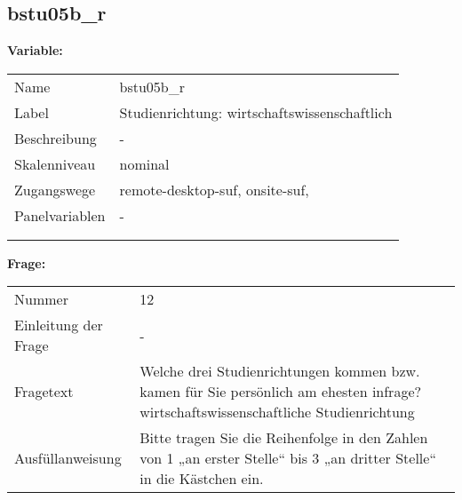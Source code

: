 	
	
	\subsection{bstu05b\_r}
	\label{subSection:bstu05b_r}

	\noindent\textbf{Variable:}\\
		\begin{tabular}{lL{11.3cm}}
			\label{tableVariable:bstu05b_r}
			Name & bstu05b\_r \\
			Label & Studienrichtung: wirtschaftswissenschaftlich \\
			Beschreibung & - \\
			Skalenniveau & nominal \\
			Zugangswege &
				remote-desktop-suf,
				onsite-suf,
 \\
			Panelvariablen & -
			 \\
			 \\
 \\
		\end{tabular}

		\vspace*{1 cm}
		\noindent\textbf{Frage:}\\
		\begin{tabular}{lL{11.3cm}}
			\label{tableQuestion:bstu05b_r}
			Nummer & 12 \\
			Einleitung der Frage & - \\
			Fragetext & Welche drei Studienrichtungen kommen bzw. kamen für Sie persönlich am ehesten infrage?
wirtschaftswissenschaftliche Studienrichtung \\
			Ausfüllanweisung & Bitte tragen Sie die Reihenfolge in den Zahlen von 1 „an erster Stelle“ bis 3 „an dritter Stelle“ in die Kästchen ein. \\
		\end{tabular}





